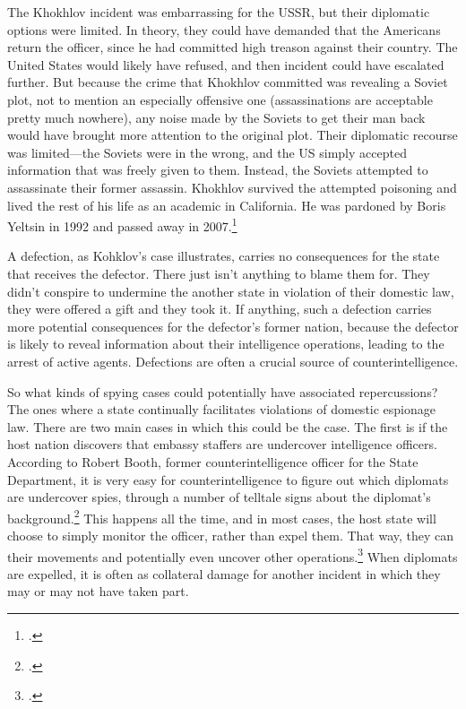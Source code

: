 \documentclass{memoir}
\begin{document}
\begin{refsegment}
The Khokhlov incident was embarrassing for the USSR, but their diplomatic options were limited. In theory, they could have demanded that the Americans return the officer, since he had committed high treason against their country. The United States would likely have refused, and then incident could have escalated further. But because the crime that Khokhlov committed was revealing a Soviet plot, not to mention an especially offensive one (assassinations are acceptable pretty much nowhere), any noise made by the Soviets to get their man back would have brought more attention to the original plot. Their diplomatic recourse was limited---the Soviets were in the wrong, and the US simply accepted information that was freely given to them. Instead, the Soviets attempted to assassinate their former assassin. Khokhlov survived the attempted poisoning and lived the rest of his life as an academic in California. He was pardoned by Boris Yeltsin in 1992 and passed away in 2007.\footcite[p.~57]{mickolus_counterintelligence_2015}

A defection, as Kohklov's case illustrates, carries no consequences for the state that receives the defector. There just isn't anything to blame them for. They didn't conspire to undermine the another state in violation of their domestic law, they were offered a gift and they took it. If anything, such a defection carries more potential consequences for the defector's former nation, because the defector is likely to reveal information about their intelligence operations, leading to the arrest of active agents. Defections are often a crucial source of counterintelligence.

So what kinds of spying cases could potentially have associated repercussions? The ones where a state continually facilitates violations of domestic espionage law. There are two main cases in which this could be the case. The first is if the host nation discovers that embassy staffers are undercover intelligence officers. According to Robert Booth, former counterintelligence officer for the State Department, it is very easy for counterintelligence to figure out which diplomats are undercover spies, through a number of telltale signs about the diplomat's background.\footcite{booth_personal_2019} This happens all the time, and in most cases, the host state will choose to simply monitor the officer, rather than expel them. That way, they can their movements and potentially even uncover other operations.\footcite{booth_personal_2019} When diplomats are expelled, it is often as collateral damage for another incident in which they may or may not have taken part.


\end{refsegment}
\end{document}
